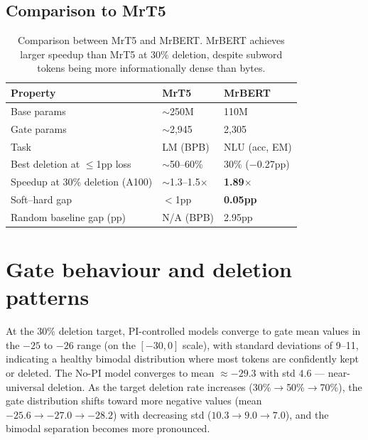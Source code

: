 \documentclass{article} %
\begin{document}
\subsection{Comparison to MrT5}

\begin{table}[H]
\centering\small
\begin{tabular}{@{}lll@{}}
\toprule
\textbf{Property} & \textbf{MrT5} & \textbf{MrBERT} \\
\midrule
Base params                             & $\sim$250M     & 110M            \\
Gate params                             & $\sim$2,945    & 2,305           \\
Task                                    & LM (BPB)       & NLU (acc, EM)   \\
Best deletion at $\leq$1pp loss         & $\sim$50--60\% & 30\% ($-$0.27pp) \\
Speedup at 30\% deletion (A100)         & $\sim$1.3--1.5$\times$ & \textbf{1.89$\times$} \\
Soft--hard gap                          & $<$1pp         & \textbf{0.05pp}  \\
Random baseline gap (pp)                & N/A (BPB)      & 2.95pp          \\
\bottomrule
\end{tabular}
\caption{Comparison between MrT5 and MrBERT. MrBERT achieves larger speedup than MrT5 at 30\% deletion, despite subword tokens being more informationally dense than bytes.}
\label{tab:comparison-mrt5}
\end{table}


\section{Gate behaviour and deletion patterns}
\label{app:gate-behaviour}

At the 30\% deletion target, PI-controlled models converge to gate mean values in the $-25$ to $-26$ range (on the $[-30,0]$ scale), with standard deviations of 9--11, indicating a healthy bimodal distribution where most tokens are confidently kept or deleted. The No-PI model converges to mean $\approx-29.3$ with std $4.6$ --- near-universal deletion. As the target deletion rate increases (30\%$\to$50\%$\to$70\%), the gate distribution shifts toward more negative values (mean $-25.6\to-27.0\to-28.2$) with decreasing std ($10.3\to9.0\to7.0$), and the bimodal separation becomes more pronounced.
\end{document}
